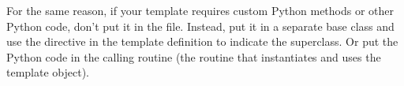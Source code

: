 For the same reason, if your template requires custom Python methods or
other Python code, don't put it in the  file.  Instead, put
it in a separate base class and use the  directive in the
template definition to indicate the superclass.  Or put the Python code
in the calling routine (the routine that instantiates and uses the template
object).



